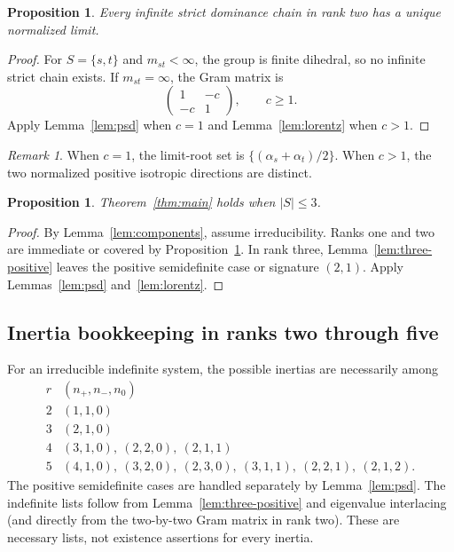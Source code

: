 \documentclass[11pt,reqno]{amsart}
\theoremstyle{plain}
\newtheorem{proposition}[theorem]{Proposition}
\theoremstyle{definition}
\theoremstyle{remark}
\newtheorem{remark}[theorem]{Remark}
\numberwithin{equation}{section}
\begin{document}
\begin{proposition}\label{prop:rank2}
Every infinite strict dominance chain in rank two has a unique normalized limit.
\end{proposition}
\begin{proof}
For $S=\{s,t\}$ and $m_{st}<\infty$, the group is finite dihedral, so no infinite strict chain exists. If $m_{st}=\infty$, the Gram matrix is
\[
\begin{pmatrix}1&-c\\-c&1\end{pmatrix},\qquad c\geq1.
\]
Apply Lemma~\ref{lem:psd} when $c=1$ and Lemma~\ref{lem:lorentz} when $c>1$.
\end{proof}

\begin{remark}
When $c=1$, the limit-root set is $\{(\alpha_s+\alpha_t)/2\}$. When $c>1$, the two normalized positive isotropic directions are distinct.
\end{remark}

\begin{proposition}\label{prop:rank3}
Theorem~\ref{thm:main} holds when $|S|\leq3$.
\end{proposition}
\begin{proof}
By Lemma~\ref{lem:components}, assume irreducibility. Ranks one and two are immediate or covered by Proposition~\ref{prop:rank2}. In rank three, Lemma~\ref{lem:three-positive} leaves the positive semidefinite case or signature $(2,1)$. Apply Lemmas~\ref{lem:psd} and~\ref{lem:lorentz}.
\end{proof}


\subsection{Inertia bookkeeping in ranks two through five}
For an irreducible indefinite system, the possible inertias are necessarily among
\[
\begin{array}{c|l}
 r& (n_+,n_-,n_0)\\\hline
 2&(1,1,0)\\
 3&(2,1,0)\\
 4&(3,1,0),\ (2,2,0),\ (2,1,1)\\
 5&(4,1,0),\ (3,2,0),\ (2,3,0),\ (3,1,1),\ (2,2,1),\ (2,1,2).
\end{array}
\]
The positive semidefinite cases are handled separately by Lemma~\ref{lem:psd}. The indefinite lists follow from Lemma~\ref{lem:three-positive} and eigenvalue interlacing (and directly from the two-by-two Gram matrix in rank two). These are necessary lists, not existence assertions for every inertia.
\end{document}
